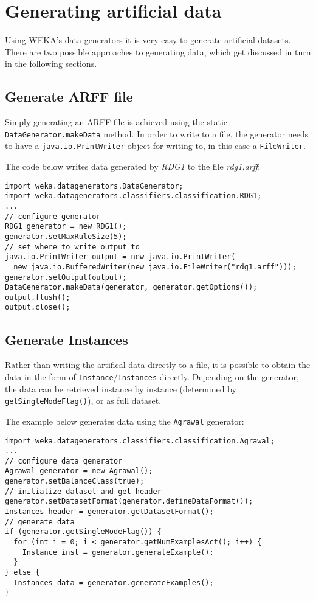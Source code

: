 \newpage
\section{Generating artificial data}
\label{api_artificial_datasets}
Using WEKA's data generators it is very easy to generate artificial datasets. 
There are two possible approaches to generating data, which get discussed in 
turn in the following sections.

\subsection{Generate ARFF file}
Simply generating an ARFF file is achieved using the static \texttt{DataGenerator.makeData}
method. In order to write to a file, the generator needs to have a \texttt{java.io.PrintWriter}
object for writing to, in this case a \texttt{FileWriter}.

The code below writes data generated by \textit{RDG1} to the file \textit{rdg1.arff}:
\begin{verbatim}
import weka.datagenerators.DataGenerator;
import weka.datagenerators.classifiers.classification.RDG1;
...
// configure generator
RDG1 generator = new RDG1();
generator.setMaxRuleSize(5);
// set where to write output to
java.io.PrintWriter output = new java.io.PrintWriter(
  new java.io.BufferedWriter(new java.io.FileWriter("rdg1.arff")));
generator.setOutput(output);
DataGenerator.makeData(generator, generator.getOptions());
output.flush();
output.close();
\end{verbatim}


\subsection{Generate Instances}
Rather than writing the artifical data directly to a file, it is possible to obtain the 
data in the form of \texttt{Instance}/\texttt{Instances} directly. Depending on the 
generator, the data can be retrieved instance by instance (determined by 
\texttt{getSingleModeFlag()}), or as full dataset.

The example below generates data using the \texttt{Agrawal} generator:
\begin{verbatim}
import weka.datagenerators.classifiers.classification.Agrawal;
...
// configure data generator
Agrawal generator = new Agrawal();
generator.setBalanceClass(true);
// initialize dataset and get header
generator.setDatasetFormat(generator.defineDataFormat());
Instances header = generator.getDatasetFormat();
// generate data
if (generator.getSingleModeFlag()) {
  for (int i = 0; i < generator.getNumExamplesAct(); i++) {
    Instance inst = generator.generateExample();
  }
} else {
  Instances data = generator.generateExamples();
}
\end{verbatim}


